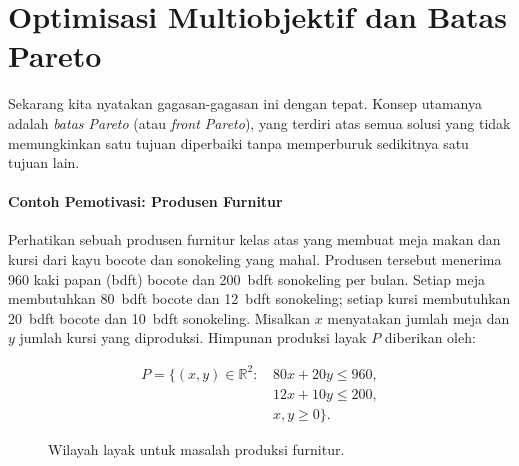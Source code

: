 \section{Optimisasi Multiobjektif dan Batas Pareto}
\label{sec:pareto-frontier}

Sekarang kita nyatakan gagasan-gagasan ini dengan tepat. Konsep utamanya adalah \emph{batas Pareto} (atau \emph{front Pareto}), yang terdiri atas semua solusi yang tidak memungkinkan satu tujuan diperbaiki tanpa memperburuk sedikitnya satu tujuan lain.

\paragraph{Contoh Pemotivasi: Produsen Furnitur}

Perhatikan sebuah produsen furnitur kelas atas yang membuat meja makan dan kursi dari kayu bocote dan sonokeling yang mahal.
Produsen tersebut menerima 960 kaki papan (bdft) bocote dan 200~bdft sonokeling per bulan. Setiap meja membutuhkan 80~bdft bocote dan 12~bdft sonokeling; setiap kursi membutuhkan 20~bdft bocote dan 10~bdft sonokeling. Misalkan \(x\) menyatakan jumlah meja dan \(y\) jumlah kursi yang diproduksi. Himpunan produksi layak \(P\) diberikan oleh:

\[
\begin{aligned}
P = \{(x,y) \in \mathbb{R}^2 :\,& 80x + 20y \le 960,\\
                                   & 12x + 10y \le 200,\\
                                   & x, y \ge 0 \}.
\end{aligned}
\]

\begin{figure}[h]
    \centering
    
    \caption{Wilayah layak untuk masalah produksi furnitur.}
\end{figure}

